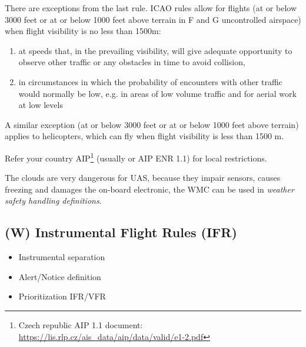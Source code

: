 There are exceptions from the last rule. ICAO rules allow for flights (at or below 3000 feet or at or below 1000 feet above terrain in F and G uncontrolled airspace) when flight visibility is no less than 1500m:
\begin{enumerate}
    \item at speeds that, in the prevailing visibility, will give adequate opportunity to observe other traffic or any obstacles in time to avoid collision,
    
    \item in circumstances in which the probability of encounters with other traffic would normally be low, e.g. in areas of low volume traffic and for aerial work at low levels
\end{enumerate}

A similar exception (at or below 3000 feet or at or below 1000 feet above terrain) applies to helicopters, which can fly when flight visibility is less than 1500 m.

Refer your country AIP\footnote{Czech republic AIP 1.1 document: \url{https://lis.rlp.cz/ais_data/aip/data/valid/e1-2.pdf}} (usually  or AIP ENR 1.1) for local restrictions.

\begin{note}
    The clouds are very dangerous for UAS, because they impair sensors, causes freezing and damages the on-board electronic, the WMC can be used in \emph{weather safety handling definitions}.
\end{note}

\subsection{(W) Instrumental Flight Rules (IFR)}\label{sec:InstrumentalFlightRules}
\begin{itemize}
    \item Instrumental separation
    \item Alert/Notice definition
    \item Prioritization IFR/VFR
\end{itemize}